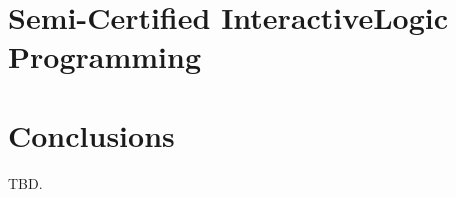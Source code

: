 \documentclass[a4paper]{tufte-book}
\begin{document}


\chapter{Semi-Certified Interactive\newline Logic Programming} 
\label{ch:scilp}



\chapter*{Conclusions}

TBD.




\printindex
\end{document}
